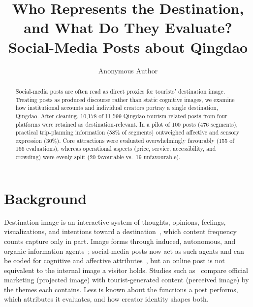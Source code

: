 \documentclass[runningheads]{llncs}
\begin{document}
\title{Who Represents the Destination, and What Do They Evaluate? Social-Media Posts about Qingdao}

\author{Anonymous Author}

\maketitle

\begin{abstract}
Social-media posts are often read as direct proxies for tourists' destination image. Treating posts as produced discourse rather than static cognitive images, we examine how institutional accounts and individual creators portray a single destination, Qingdao. After cleaning, 10{,}178 of 11{,}599 Qingdao tourism-related posts from four platforms were retained as destination-relevant. In a pilot of 100 posts (476 segments), practical trip-planning information (58\% of segments) outweighed affective and sensory expression (30\%). Core attractions were evaluated overwhelmingly favourably (155 of 166 evaluations), whereas operational aspects (price, service, accessibility, and crowding) were evenly split (20 favourable vs.\ 19 unfavourable).

\end{abstract}

\section{Background}
Destination image is an interactive system of thoughts, opinions, feelings, visualizations, and intentions toward a destination~\cite{tasci2007}, which content frequency counts capture only in part. Image forms through induced, autonomous, and organic information agents~\cite{gartner1994}; social-media posts now act as such agents and can be coded for cognitive and affective attributes~\cite{garay2019}, but an online post is not equivalent to the internal image a visitor holds. Studies such as~\cite{sun2021} compare official marketing (projected image) with tourist-generated content (perceived image) by the themes each contains. Less is known about the functions a post performs, which attributes it evaluates, and how creator identity shapes both.
\end{document}
